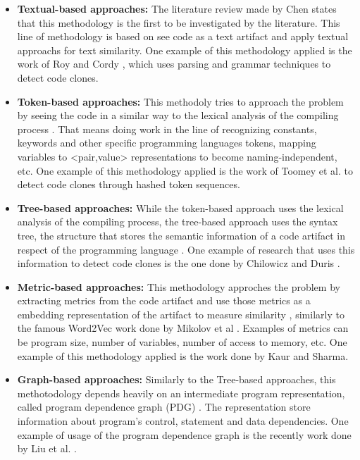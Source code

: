 \begin{itemize}
	\item \textbf{Textual-based approaches:} The literature review made by Chen \citep{litreview}  states that this methodology
	is the first to be investigated by the literature. This line of methodology is based on see code as a text artifact and apply
	textual approachs for text similarity. One example of this methodology applied is the work of Roy and Cordy \citep{textexample}, 
	which uses parsing and grammar techniques to detect code clones.

	\item \textbf{Token-based approaches:} This methodoly tries to approach the problem by seeing the code in a similar way to
	the lexical analysis of the compiling process \citep{litreview} . That means doing work in the line of recognizing constants, keywords and other 
	specific programming languages tokens, mapping variables to <pair,value> representations to become naming-independent, etc. One example of 
	this methodology applied  is the work of Toomey et al. \citep{tokenexample} to detect code clones through hashed token sequences.

	\item \textbf{Tree-based approaches:} While the token-based approach uses the lexical analysis of the compiling process, the 
	tree-based approach uses the syntax tree, the structure that  stores the semantic information of a code artifact in respect of the 
	programming language \citep{compiler}. One example of research that uses this information to detect code clones is the one done by
	Chilowicz and Duris \citep{treeexample}.

	\item \textbf{Metric-based approaches:} This methodology approches the problem by extracting metrics from the code artifact and use 
	those metrics as a embedding representation of the artifact to measure similarity \citep{litreview}, similarly to the famous  
	Word2Vec work done by Mikolov et al \citep{wordtovec}. Examples of metrics can be program size, number of variables, number of 
	access to memory, etc. One example of this methodology applied is the work done by Kaur and Sharma. \citep{metricexample}

	\item \textbf{Graph-based approaches:} Similarly to the Tree-based approaches, this methotodology depends heavily on an intermediate
	program representation, called program dependence graph (PDG) \citep{prodg}. The representation store information 
	about program's control, statement and data dependencies. One example of usage of the program dependence graph is 
	the recently work done by Liu et al. \citep{tailor}.
\end{itemize}









